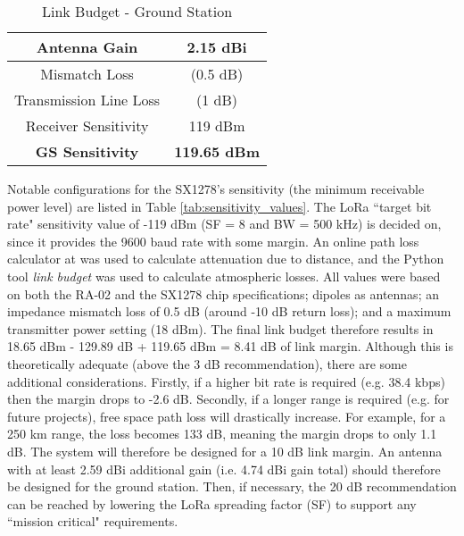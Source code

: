 \begin{table}[!htb]
  \centering
  \renewcommand{\arraystretch}{1.2}
  \begin{tabular}{ |c|c| }
  \hline
  Antenna Gain                  & 2.15 dBi                \\ \hline
  Mismatch Loss                 & (0.5 dB)                \\ \hline
  Transmission Line Loss        & (1 dB)                  \\ \hline
  Receiver Sensitivity          & 119 dBm                 \\ \hline
  \textbf{GS Sensitivity}       & \textbf{119.65 dBm}     \\ \hline
  \end{tabular}
  \caption{Link Budget - Ground Station}
  \label{tab:link_budget_gs}
\end{table}

Notable configurations for the SX1278's sensitivity (the minimum receivable power level) are listed in Table \ref{tab:sensitivity_values}. The LoRa ``target bit rate" sensitivity value of -119 dBm (SF = 8 and BW = 500 kHz) is decided on, since it provides the 9600 baud rate with some margin.  An online path loss calculator at \cite{site-pathLossCalculator} was used to calculate attenuation due to distance, and the Python tool \textit{link budget} was used to calculate atmospheric losses. All values were based on both the RA-02 and the SX1278 chip specifications; dipoles as antennas; an impedance mismatch loss of 0.5 dB (around -10 dB return loss); and a maximum transmitter power setting (18 dBm). The final link budget therefore results in 18.65 dBm - 129.89 dB + 119.65 dBm = 8.41 dB of link margin. Although this is theoretically adequate (above the 3 dB recommendation), there are some additional considerations. Firstly, if a higher bit rate is required (e.g. 38.4 kbps) then the margin drops to -2.6 dB. Secondly, if a longer range is required (e.g. for future projects), free space path loss will drastically increase. For example, for a 250 km range, the loss becomes 133 dB, meaning the margin drops to only 1.1 dB. The system will therefore be designed for a 10 dB link margin. An antenna with at least 2.59 dBi additional gain (i.e. 4.74 dBi gain total) should therefore be designed for the ground station. Then, if necessary, the 20 dB recommendation can be reached by lowering the LoRa spreading factor (SF) to support any ``mission critical" requirements.
